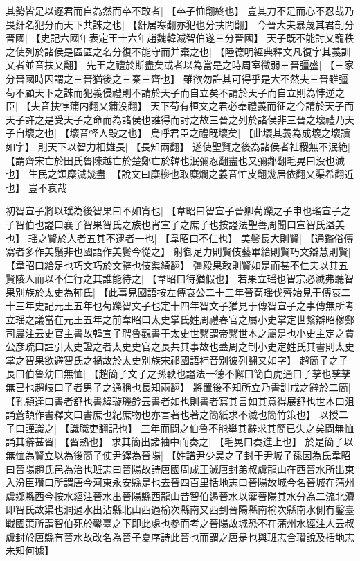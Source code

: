 其勢皆足以逐君而自為然而卒不敢者|{
	【卒子恤翻終也】}
豈其力不足而心不忍哉乃畏姧名犯分而天下共誅之也|{
	【姧居寒翻亦犯也分扶問翻】}
今晉大夫暴蔑其君剖分晉國|{
	【史記六國年表定王十六年趙魏韓滅智伯遂三分晉國】}
天子既不能討又寵秩之使列於諸侯是區區之名分復不能守而并棄之也|{
	【陸德明經典釋文凡復字其義訓又者並音扶又翻】}
先王之禮於斯盡矣或者以為當是之時周室微弱三晉彊盛|{
	【三家分晉國時因謂之三晉猶後之三秦三齊也】}
雖欲勿許其可得乎是大不然夫三晉雖彊苟不顧天下之誅而犯義侵禮則不請於天子而自立矣不請於天子而自立則為悖逆之臣|{
	【夫音扶悖蒲内翻又蒲没翻】}
天下苟有桓文之君必奉禮義而征之今請於天子而天子許之是受天子之命而為諸侯也誰得而討之故三晉之列於諸侯非三晉之壞禮乃天子自壞之也|{
	【壞音怪人毁之也】}
烏呼君臣之禮旣壞矣|{
	【此壞其義為成壞之壞讀如字】}
則天下以智力相雄長|{
	【長知兩翻】}
遂使聖賢之後為諸侯者社稷無不泯絶|{
	【謂齊宋亡於田氏魯陳越亡於楚鄭亡於韓也泯彌忍翻盡也又彌鄰翻毛晃曰没也滅也】}
生民之類糜滅幾盡|{
	【說文曰糜糝也取糜爛之義音忙皮翻幾居依翻又渠希翻近也】}
豈不哀哉
\par
初智宣子將以瑶為後智果曰不如宵也|{
	【韋昭曰智宣子晉卿荀躒之子申也瑤宣子之子智伯也謚曰襄子智果智氏之族也宵宣子之庶子也按謚法聖善周聞曰宣智氏溢美也】}
瑶之賢於人者五其不逮者一也|{
	【韋昭曰不仁也】}
美鬢長大則賢|{
	【通鑑俗傳寫者多作美鬚非也國語作美鬢今從之】}
射御足力則賢伎藝畢給則賢巧文辯慧則賢|{
	【韋昭曰給足也巧文巧於文辭也伎渠綺翻】}
彊毅果敢則賢如是而甚不仁夫以其五賢陵人而以不仁行之其誰能待之|{
	【韋昭曰待猶假也】}
若果立瑶也智宗必滅弗聽智果别族於太史為輔氏|{
	【此事見國語按左傳哀公二十三年晉荀瑶伐齊始見于傳哀二十三年史記元王五年也荀躒智文子也定十四年智文子猶見于傳智宣子之事傳無所考立瑶之議當在元王五年之前韋昭曰太史掌氏姓周禮春官之屬小史掌定世繫辯昭穆鄭司農注云史官主書故韓宣子聘魯觀書于太史世繫謂帝繫世本之屬是也小史主定之賈公彦疏曰註引太史證之者太史史官之長共其事故也蓋周之制小史定姓氏其書則太史掌之智果欲避智氏之禍故於太史别族宋祁國語補音别彼列翻又如字】}
趙簡子之子長曰伯魯幼曰無恤|{
	【趙簡子文子之孫鞅也謚法一德不懈曰簡白虎通曰子孳也孳孳無已也趙岐曰子者男子之通稱也長知兩翻】}
將置後不知所立乃書訓戒之辭於二簡|{
	【孔頴達曰書者舒也書緯璇璣鈐云書者如也則書者寫其言如其意得展舒也世本曰沮誦蒼頡作書釋文曰書庶也紀庶物也亦言著也著之簡紙求不滅也簡竹策也】}
以授二子曰謹識之|{
	【識職吏翻記也】}
三年而問之伯魯不能舉其辭求其簡已失之矣問無恤誦其辭甚習|{
	【習熟也】}
求其簡出諸袖中而奏之|{
	【毛晃曰奏進上也】}
於是簡子以無恤為賢立以為後簡子使尹鐸為晉陽|{
	【姓譜尹少昊之子封于尹城子孫因為氏韋昭曰晉陽趙氏邑為治也班志曰晉陽故詩唐國周成王滅唐封弟叔虞龍山在西晉水所出東入汾臣瓚曰所謂唐今河東永安縣是也去晉四百里括地志曰晉陽故城今名晉城在蒲州虞鄉縣西今按水經注晉水出晉陽縣西龍山昔智伯遏晉水以灌晉陽其水分為二流北瀆即智氏故渠也洞過水出沾縣北山西過榆次縣南又西到晉陽縣南榆次縣南水側有鑿臺戰國策所謂智伯死於鑿臺之下即此處也參而考之晉陽故城恐不在蒲州水經注人云叔虞封於唐縣有晉水故改名為晉子夏序詩此晉也而謂之唐是也與班志合瓚說及括地志未知何據】}
